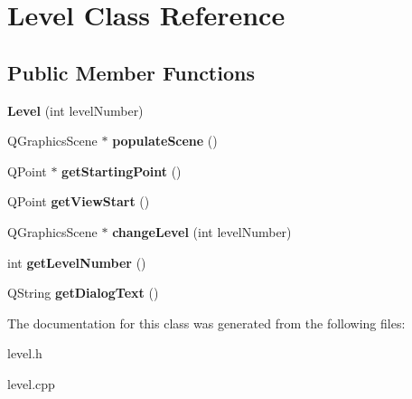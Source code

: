 \hypertarget{class_level}{}\section{Level Class Reference}
\label{class_level}
\subsection*{Public Member Functions}
\begin{DoxyCompactItemize}
\item 
\hypertarget{class_level_aba678023dfd388f8ca54dc6a51f8f3e3}{}{\bfseries Level} (int level\+Number)\label{class_level_aba678023dfd388f8ca54dc6a51f8f3e3}

\item 
\hypertarget{class_level_a898937cdec40914b45ecb23649cd5e2a}{}Q\+Graphics\+Scene $\ast$ {\bfseries populate\+Scene} ()\label{class_level_a898937cdec40914b45ecb23649cd5e2a}

\item 
\hypertarget{class_level_ae7176d05829097956f8ba57fcd4155dc}{}Q\+Point $\ast$ {\bfseries get\+Starting\+Point} ()\label{class_level_ae7176d05829097956f8ba57fcd4155dc}

\item 
\hypertarget{class_level_aa1d6d7b228f5b64d697c0cd3666ea836}{}Q\+Point {\bfseries get\+View\+Start} ()\label{class_level_aa1d6d7b228f5b64d697c0cd3666ea836}

\item 
\hypertarget{class_level_adce6f00bfa320883323a9892646cdaa8}{}Q\+Graphics\+Scene $\ast$ {\bfseries change\+Level} (int level\+Number)\label{class_level_adce6f00bfa320883323a9892646cdaa8}

\item 
\hypertarget{class_level_afbf573a6aecae9cba02d7398e5637dd5}{}int {\bfseries get\+Level\+Number} ()\label{class_level_afbf573a6aecae9cba02d7398e5637dd5}

\item 
\hypertarget{class_level_a355ebe125bc8b61b8b7db7543f65bf5e}{}Q\+String {\bfseries get\+Dialog\+Text} ()\label{class_level_a355ebe125bc8b61b8b7db7543f65bf5e}

\end{DoxyCompactItemize}


The documentation for this class was generated from the following files\+:\begin{DoxyCompactItemize}
\item 
level.\+h\item 
level.\+cpp\end{DoxyCompactItemize}
